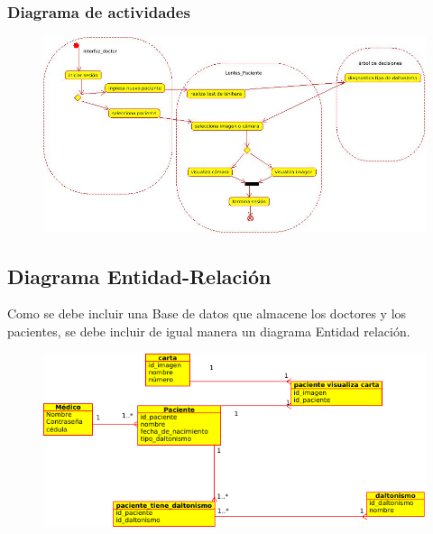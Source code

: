 \documentclass[10pt]{article}
\begin{document}
\subsubsection{Diagrama de actividades}


\begin{figure}[H]
	\begin{center}
\includegraphics[scale = 0.75]{UML/actividades.jpeg}
	\end{center} 
\end{figure}

\subsection{Diagrama Entidad-Relación}

Como se debe incluir una Base de datos que almacene los doctores y los pacientes, se debe incluir de igual manera un diagrama Entidad 
relación.

\begin{figure}[H]
	\begin{center}
\includegraphics[scale = 1.0]{UML/er.png}
	\end{center} 
\end{figure}
\end{document}
